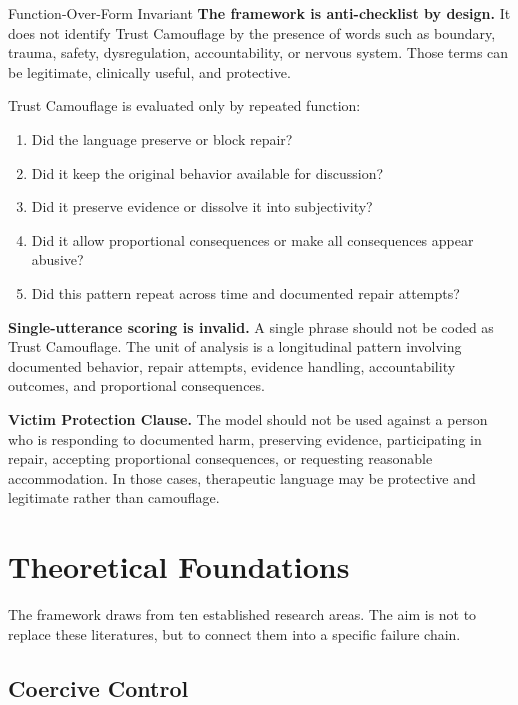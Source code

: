 \documentclass[11pt, letterpaper]{article}
\newcommand{\term}[1]{\textbf{#1}}
\begin{document}
\begin{frameworkbox}{Function-Over-Form Invariant}
\term{The framework is anti-checklist by design.} It does not identify Trust Camouflage by the presence of words such as boundary, trauma, safety, dysregulation, accountability, or nervous system. Those terms can be legitimate, clinically useful, and protective.

\vspace{0.5em}
Trust Camouflage is evaluated only by repeated function:
\begin{enumerate}
    \item Did the language preserve or block repair?
    \item Did it keep the original behavior available for discussion?
    \item Did it preserve evidence or dissolve it into subjectivity?
    \item Did it allow proportional consequences or make all consequences appear abusive?
    \item Did this pattern repeat across time and documented repair attempts?
\end{enumerate}
\end{frameworkbox}

\term{Single-utterance scoring is invalid.} A single phrase should not be coded as Trust Camouflage. The unit of analysis is a longitudinal pattern involving documented behavior, repair attempts, evidence handling, accountability outcomes, and proportional consequences.

\term{Victim Protection Clause.} The model should not be used against a person who is responding to documented harm, preserving evidence, participating in repair, accepting proportional consequences, or requesting reasonable accommodation. In those cases, therapeutic language may be protective and legitimate rather than camouflage.

\section{Theoretical Foundations}

The framework draws from ten established research areas. The aim is not to replace these literatures, but to connect them into a specific failure chain.

\subsection{Coercive Control}
\end{document}

